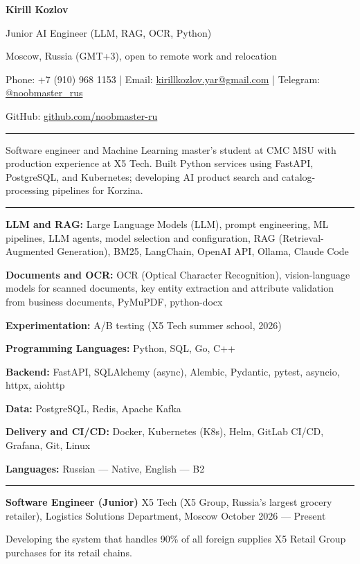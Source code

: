 \documentclass[10pt,a4paper]{article}
\newcommand{\cvsection}[1]{%
  \vspace{5pt}{\large\bfseries #1}\par\vspace{2pt}\hrule\vspace{3pt}}
\newcommand{\cventry}[3]{%
  \textbf{#1} \textbar{} #3 \textbar{} #2\par\vspace{1pt}}
\begin{document}
{\LARGE\bfseries Kirill Kozlov}\par\vspace{3pt}
Junior AI Engineer (LLM, RAG, OCR, Python)\par\vspace{3pt}
Moscow, Russia (GMT+3), open to remote work and relocation\par
Phone: +7 (910) 968 1153 | Email: \href{mailto:kirillkozlov.yar@gmail.com}{kirillkozlov.yar@gmail.com} | Telegram: \href{https://t.me/noobmaster_rus}{@noobmaster\_rus}\par
GitHub: \href{https://github.com/noobmaster-ru}{github.com/noobmaster-ru}

\cvsection{Professional Summary}
Software engineer and Machine Learning master's student at CMC MSU with production experience at X5 Tech. Built Python services using FastAPI, PostgreSQL, and Kubernetes; developing AI product search and catalog-processing pipelines for Korzina.

\cvsection{Technical Skills}
\textbf{LLM and RAG:} Large Language Models (LLM), prompt engineering, ML pipelines, LLM agents, model selection
and configuration, RAG (Retrieval-Augmented Generation), BM25, LangChain, OpenAI API, Ollama, Claude Code\par
\textbf{Documents and OCR:} OCR (Optical Character Recognition), vision-language models for scanned documents,
key entity extraction and attribute validation from business documents, PyMuPDF, python-docx\par
\textbf{Experimentation:} A/B testing (X5 Tech summer school, 2026)\par
\textbf{Programming Languages:} Python, SQL, Go, C++\par
\textbf{Backend:} FastAPI, SQLAlchemy (async), Alembic, Pydantic, pytest, asyncio, httpx, aiohttp\par
\textbf{Data:} PostgreSQL, Redis, Apache Kafka\par
\textbf{Delivery and CI/CD:} Docker, Kubernetes (K8s), Helm, GitLab CI/CD, Grafana, Git, Linux\par
\textbf{Languages:} Russian --- Native, English --- B2

\cvsection{Work Experience}
\cventry{Software Engineer (Junior)}{October 2026 --- Present}{X5 Tech (X5 Group, Russia's largest grocery retailer), Logistics Solutions Department, Moscow}
\begin{cvitems}
    \item Developing the system that handles 90\% of all foreign supplies X5 Retail Group purchases for its retail chains.
\end{cvitems}
\vspace{2pt}
\end{document}
